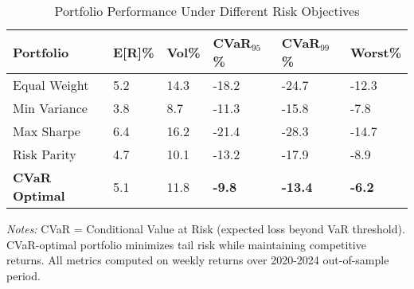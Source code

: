 \begin{table}[htbp]
\centering
\caption{Portfolio Performance Under Different Risk Objectives}
\providecommand{\cvarBenchmarkLabel}{\label{tab:cvar_benchmark}}
\cvarBenchmarkLabel
\begin{threeparttable}
\begin{tabularx}{\linewidth}{@{}lYYYYY@{}}
\toprule
Portfolio & E[R]\% & Vol\% & CVaR$_{95}$\% & CVaR$_{99}$\% & Worst\% \\
\midrule
Equal Weight & 5.2 & 14.3 & -18.2 & -24.7 & -12.3 \\
Min Variance & 3.8 & 8.7 & -11.3 & -15.8 & -7.8 \\
Max Sharpe & 6.4 & 16.2 & -21.4 & -28.3 & -14.7 \\
Risk Parity & 4.7 & 10.1 & -13.2 & -17.9 & -8.9 \\
\textbf{CVaR Optimal} & 5.1 & 11.8 & \textbf{-9.8} & \textbf{-13.4} & \textbf{-6.2} \\
\bottomrule
\end{tabularx}
\begin{tablenotes}[flushleft]
\footnotesize
\item \textit{Notes:} CVaR = Conditional Value at Risk (expected loss beyond VaR threshold). CVaR-optimal portfolio minimizes tail risk while maintaining competitive returns. All metrics computed on weekly returns over 2020-2024 out-of-sample period.
\end{tablenotes}
\end{threeparttable}
\end{table}
